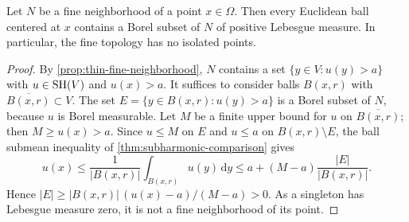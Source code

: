 \begin{proposition}\label{prop:fine-positive-measure}
Let $N$ be a fine neighborhood of a point $x\in\Omega$. Then every Euclidean ball centered at $x$ contains a Borel subset of $N$ of positive Lebesgue measure. In particular, the fine topology has no isolated points.
\end{proposition}
\begin{proof}
By \cref{prop:thin-fine-neighborhood}, $N$ contains a set $\{y\in V:u(y)>a\}$ with $u\in\mathrm{SH}(V)$ and $u(x)>a$. It suffices to consider balls $B(x,r)$ with $\overline{B(x,r)}\subset V$. The set $E=\{y\in B(x,r):u(y)>a\}$ is a Borel subset of $N$, because $u$ is Borel measurable. Let $M$ be a finite upper bound for $u$ on $\overline{B(x,r)}$; then $M\geq u(x)>a$. Since $u\leq M$ on $E$ and $u\leq a$ on $B(x,r)\setminus E$, the ball submean inequality of \cref{thm:subharmonic-comparison} gives
\[
 u(x)\leq\frac{1}{|B(x,r)|}\int_{B(x,r)}u(y)\,\mathrm d y\leq a+(M-a)\frac{|E|}{|B(x,r)|}.
\]
Hence $|E|\geq|B(x,r)|\,(u(x)-a)/(M-a)>0$. As a singleton has Lebesgue measure zero, it is not a fine neighborhood of its point.
\end{proof}


